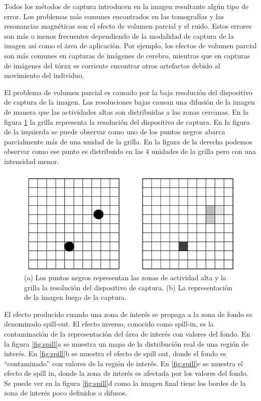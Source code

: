 Todos los métodos de captura introducen en la imagen resultante algún tipo de error. Los problemas más comunes encontrados en las tomografías y las resonancias magnéticas son el efecto de volumen parcial y el ruido. Estos errores son más o menos frecuentes dependiendo de la modalidad de captura de la imagen así como el área de aplicación. Por ejemplo, los efectos de volumen parcial son más comunes en capturas de imágenes de cerebro, mientras que en capturas de imágenes del tórax es corriente encontrar otros artefactos debido al movimiento del individuo.

El problema de volumen parcial es causado por la baja resolución del dispositivo de captura de la imagen. Las resoluciones bajas causan una difusión de la imagen de manera que las actividades altas son distribuidas a las zonas cercanas. En la figura \ref{fig:resolucion} la grilla representa la resolución del dispositivo de captura. En la figura de la izquierda se puede observar como uno de los puntos negros abarca parcialmente más de una unidad de la grilla. En la figura de la derecha podemos observar como ese punto es distribuido en las 4 unidades de la grilla pero con una intensidad menor.

\begin{figure}[H]
\centering
\includegraphics[scale=0.3]{images/resolution.png}
\caption{(a) Los puntos negros representan las zonas de actividad alta y la grilla la resolución del dispositivo de captura. (b) La representación de la imagen luego de la captura.}
\label{fig:resolucion}
\end{figure}

El efecto producido cuando una zona de interés se propaga a la zona de fondo es denominado spill-out. El efecto inverso, conocido como spill-in, es la contaminación de la representación del área de interés con valores del fondo. En la figura \ref{fig:spill}a se muestra un mapa de la distribución real de una región de interés. En \ref{fig:spill}b se muestra el efecto de spill out, donde el fondo es “contaminado” con valores de la región de interés. En \ref{fig:spill}c se muestra el efecto de spill in, donde la zona de interés es afectada por los valores del fondo. Se puede ver en la figura \ref{fig:spill}d como la imagen final tiene los bordes de la zona de interés poco definidos o difusos.

